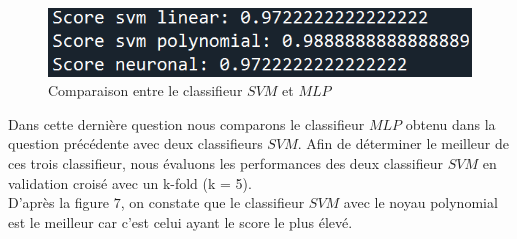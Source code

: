 \documentclass[frenchb]{report}
\newcommand{\1}{\mathbbm{1}}
\theoremstyle{definition}\newtheorem{defn}{Définition}
\theoremstyle{definition}\newtheorem{exm}{Exemple}
\theoremstyle{definition}\newtheorem{nota}{Notation}
\theoremstyle{definition}\newtheorem{rem}{Remarque}
\begin{document}

\begin{figure}[H]
	\centering
	\includegraphics[scale=0.7]{images/SVM_vs_MLP.png}
	\caption{Comparaison entre le classifieur $SVM$ et $MLP$}
\end{figure}

Dans cette dernière question nous comparons le classifieur $MLP$ obtenu dans la question précédente avec deux classifieurs $SVM$. Afin de déterminer le meilleur de ces trois classifieur, nous évaluons les performances des deux classifieur $SVM$ en validation croisé avec un k-fold (k = 5).\\
D'après la figure $7$, on constate que le classifieur $SVM$ avec le noyau polynomial est le meilleur car c'est celui ayant le score le plus élevé.
\end{document}
